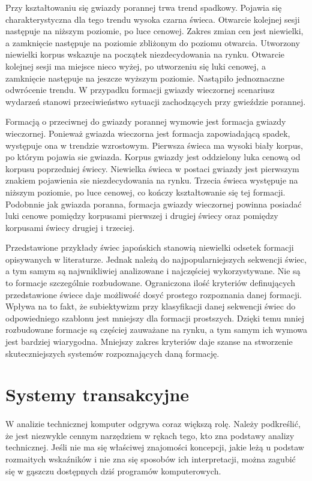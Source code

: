\documentclass[pdflatex,11pt]{aghdpl}
\begin{document}
Przy kształtowaniu się gwiazdy porannej trwa trend spadkowy. Pojawia się charakterystyczna dla tego trendu wysoka czarna świeca. Otwarcie kolejnej sesji następuje na niższym poziomie, po luce cenowej. Zakres zmian cen jest niewielki, a zamknięcie następuje na poziomie zbliżonym do poziomu otwarcia. Utworzony niewielki korpus wskazuje na początek niezdecydowania na rynku. Otwarcie kolejnej sesji ma miejsce nieco wyżej, po utworzeniu się luki cenowej, a zamknięcie następuje na jeszcze wyższym poziomie. Nastąpiło jednoznaczne odwrócenie trendu. W przypadku formacji gwiazdy wieczornej scenariusz wydarzeń stanowi przeciwieństwo sytuacji zachodzących przy gwieździe porannej.

Formacją o przeciwnej do gwiazdy porannej wymowie jest formacja gwiazdy wieczornej. Ponieważ gwiazda wieczorna jest formacja zapowiadającą spadek, występuje ona w trendzie wzrostowym. Pierwsza świeca ma wysoki biały korpus, po którym pojawia sie gwiazda. Korpus gwiazdy jest oddzielony luka cenową od korpusu poprzedniej świecy. Niewielka świeca w postaci gwiazdy jest pierwszym znakiem pojawienia sie niezdecydowania na rynku. Trzecia świeca występuje na niższym poziomie, po luce cenowej, co kończy kształtowanie się tej formacji. Podobnnie jak gwiazda poranna, formacja gwiazdy wieczornej powinna posiadać luki cenowe pomiędzy korpusami pierwszej i drugiej świecy oraz pomiędzy korpusami świecy drugiej i trzeciej.

Przedstawione przykłady świec japońskich stanowią niewielki odsetek formacji opisywanych w literaturze. Jednak należą do najpopularniejszych sekwencji świec, a tym samym są najwnikliwiej analizowane i najczęściej wykorzystywane. Nie są to formacje szczególnie rozbudowane. Ograniczona ilość kryteriów definujących przedstawione świece daje możliwość dosyć prostego rozpoznania danej formacji. Wpływa na to fakt, że subiektywizm przy klasyfikacji danej sekwencji świec do odpowiedniego szablonu jest mniejszy dla formacji prostszych. Dzięki temu mniej rozbudowane formacje są częściej zauważane na rynku, a tym samym ich wymowa jest bardziej wiarygodna. Mniejszy zakres kryteriów daje szanse na stworzenie skuteczniejszych systemów rozpoznających daną formację.  
 
\section{Systemy transakcyjne}
\paragraph{}
W analizie technicznej komputer odgrywa coraz większą rolę. Należy podkreślić, że jest niezwykle cennym narzędziem w rękach tego, kto zna podstawy analizy technicznej. Jeśli nie ma się właściwej znajomości koncepcji, jakie leżą u podstaw rozmaitych wskaźników i nie zna się sposobów ich interpretacji, można zagubić się w gąszczu dostępnych dziś programów komputerowych\cite{8}.
\end{document}
